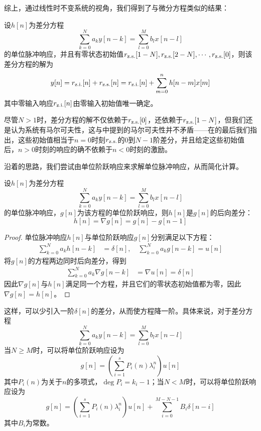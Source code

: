 综上，通过线性时不变系统的视角，我们得到了与微分方程类似的结果：
\begin{theorem}
    设$h[n]$为差分方程
    $$\sum_{k=0}^{N}a_k y[n-k] = \sum_{l=0}^{M}b_l x[n-l]$$
    的单位脉冲响应，并且有零状态初始值$r_{\operatorname{z.s.}}[1-N],r_{\operatorname{z.s.}}[2-N],\cdots,r_{\operatorname{z.s.}}[0]$，则该差分方程的解为
    \begin{align*}
        y[n]=r_{\operatorname{z.i.}}[n]+r_{\operatorname{z.s.}}[n]=r_{\operatorname{z.i.}}[n]+\sum_{m=0}^{n}h[n-m]x[m]
    \end{align*}
    其中零输入响应$r_{\operatorname{z.i.}}[n]$由零输入初始值唯一确定。
\end{theorem}

尽管$N>1$时，差分方程的解不仅依赖于$r_{\operatorname{z.s.}}[0]$，还依赖于$r_{\operatorname{z.s.}}[1-N]$，但我们还是认为系统有马尔可夫性，这与中提到的马尔可夫性并不矛盾——在的最后我们指出，这些初始值相当于$n=0$时刻$r_{\operatorname{z.s.}}$的$0$到$N-1$阶差分，并且给定这些初始值后，$n>0$时刻的响应的确不依赖于$n<0$时刻的激励。

沿着的思路，我们尝试由单位阶跃响应来求解单位脉冲响应，从而简化计算。

\begin{lemma}
    设$h[n]$为差分方程
    $$\sum_{k=0}^{N}a_k y[n-k] = \sum_{l=0}^{M}b_l x[n-l]$$
    的单位脉冲响应，$g[n]$为该方程的单位阶跃响应，则$h[n]$是$g[n]$的后向差分：
    $$h[n]=\nabla g[n]=g[n]-g[n-1]$$
\end{lemma}
\begin{proof}
    单位脉冲响应$h[n]$与单位阶跃响应$g[n]$分别满足以下方程：
    \begin{align*}
        \sum_{k=0}^{N}a_k h[n-k] &= \delta[n],\quad\sum_{k=0}^{N}a_k g[n-k]= u[n]
    \end{align*}
    将$g[n]$的方程两边同时后向差分，得到\begin{align*}
    \sum_{k=0}^{N}a_k \nabla g[n-k] &= \nabla u[n]=\delta[n]
    \end{align*}
    因此$\nabla g[n]$与$h[n]$满足同一个方程，并且它们的零状态初始值都为零，因此$\nabla g[n]=h[n]$。
\end{proof}

这样，可以少引入一阶$\delta[n]$的差分，从而使方程降一阶。具体来说，对于差分方程
$$\sum_{k=0}^{N}a_k y[n-k] = \sum_{l=0}^{M}b_l x[n-l]$$
当$N\geq M$时，可以将单位阶跃响应设为
$$g[n]=\left(\sum_{i=1}^s P_i(n) \lambda_i^n \right)u[n]$$
其中$P_i(n)$为关于$n$的多项式，$\deg P_i=k_i-1$；当$N<M$时，可以将单位阶跃响应设为
$$g[n]=\left(\sum_{i=1}^s P_i(n) \lambda_i^n \right)u[n]+\sum_{i=0}^{M-N-1}B_i\delta[n-i]$$
其中$B_i$为常数。

